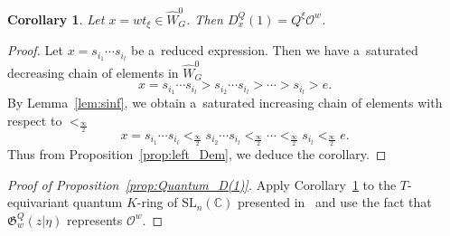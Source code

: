 \documentclass[10pt,a4paper]{amsart}
\numberwithin{equation}{section}
\newcommand{\C}{\mathbb{C}}
\newcommand{\Gro}[1]{\mathfrak{G}^Q_{#1}}
\renewcommand{\O}{\mathscr{O}}
\newcommand{\SL}{\mathrm{SL}}
\newcommand{\sinf}{\frac{\infty}{2}}
\newtheorem{Corollary}[Theorem]{Corollary}
\theoremstyle{definition}
\begin{document}
 \begin{Corollary} \label{cor:BF}
Let $x=wt_\xi\in \hat{W}_G^0$. Then
$
D_x^Q(1)
=Q^\xi \mathscr{O}^{w}$.
\end{Corollary}
\begin{proof}
Let $x=s_{i_1}\cdots s_{i_l}$ be a~reduced expression.
Then we have a~saturated decreasing chain of elements in
$\hat{W}_G^0$
\[
x=s_{i_1}\cdots s_{i_l}
>s_{i_2}\cdots s_{i_l}
>
\cdots
>s_{i_l}>e.
\]
By Lemma~\ref{lem:sinf}, we obtain a~saturated increasing chain of elements
with respect to $<_\sinf$
\[
x=s_{i_1}\cdots s_{i_l}
<_\sinf s_{i_2}\cdots s_{i_l}
<_\sinf
\cdots
<_\sinf s_{i_l}<_\sinf e.
\]
Thus from Proposition~\ref{prop:left_Dem}, we deduce the corollary.
\end{proof}
\begin{proof}[Proof of Proposition~\ref{prop:Quantum_D(1)}]
Apply Corollary~\ref{cor:BF} to the $T$-equivariant
quantum $K$-ring of \linebreak
$\SL_n(\C)$ presented in~\cite{MNS1} and use the fact that
$\Gro{w}(z|\eta)$ represents $\O^w$.
\end{proof}
\end{document}
